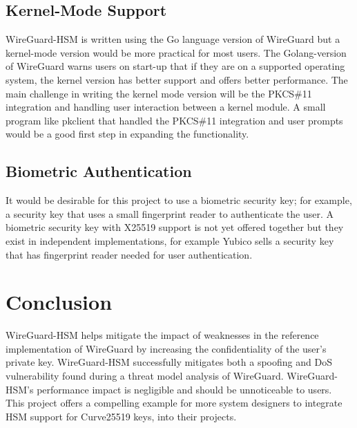 \documentclass [11pt, proquest] {uwthesis}[2020/02/24]
\begin{document}
\subsection{Kernel-Mode Support}
WireGuard-HSM is written using the Go language version of WireGuard but a kernel-mode version would be more practical for most users. The Golang-version of WireGuard warns users on start-up that if they are on a supported operating system, the kernel version has better support and offers better performance. The main challenge in writing the kernel mode version will be the PKCS\#11 integration and handling user interaction between a kernel module. A small program like pkclient that handled the PKCS\#11 integration and user prompts would be a good first step in expanding the functionality.

\subsection{Biometric Authentication}
It would be desirable for this project to use a biometric security key; for example, a security key that uses a small fingerprint reader to authenticate the user. A biometric security key with X25519 support is not yet offered together but they exist in independent implementations, for example Yubico sells a security key that has fingerprint reader needed for user authentication\cite{yubico_yubikey_2022}. 

\section{Conclusion}
WireGuard-HSM helps mitigate the impact of weaknesses in the reference implementation of WireGuard by increasing the confidentiality of the user's private key. WireGuard-HSM successfully mitigates both a spoofing and DoS vulnerability found during a threat model analysis of WireGuard.
WireGuard-HSM's performance impact is negligible and should be unnoticeable to users.
This project offers a compelling example for more system designers to integrate HSM support for Curve25519 keys, into their projects.




\end{document}
